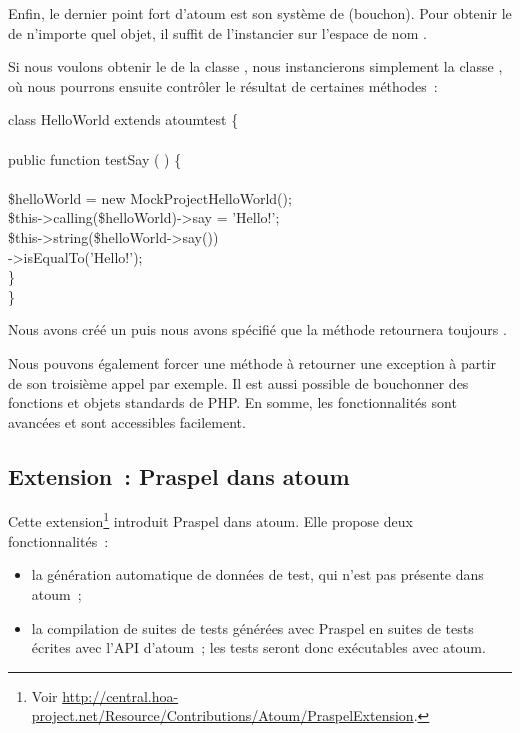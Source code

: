 Enfin, le dernier point fort d'atoum est son système de 
(bouchon). Pour obtenir le  de n'importe quel objet, il suffit
de l'instancier sur l'espace de nom .

\begin{example}

Si nous voulons obtenir le  de la classe
, nous instancierons simplement la classe
, où nous pourrons ensuite
contrôler le résultat de certaines méthodes~:
%
\begin{pre}
class HelloWorld extends \bslash{}atoum\bslash{}test \{ \\
 \\
    public function testSay ( ) \{ \\
 \\
        \$helloWorld = new \bslash{}Mock\bslash{}Project\bslash{}HelloWorld(); \\
        \$this->calling(\$helloWorld)->say = 'Hello!'; \\
        \$this->string(\$helloWorld->say()) \\
                  ->isEqualTo('Hello!'); \\
    \} \\
\}
\end{pre}
%
Nous avons créé un  puis nous avons spécifié que la méthode
 retournera toujours .

\end{example}

Nous pouvons également forcer une méthode à retourner une exception à partir de
son troisième appel par exemple. Il est aussi possible de bouchonner des
fonctions et objets standards de PHP. En somme, les fonctionnalités sont
avancées et sont accessibles facilement.

\subsection{Extension~: Praspel dans atoum}
\label{subsection:tools:extension}

Cette extension\footnote{Voir
\url{http://central.hoa-project.net/Resource/Contributions/Atoum/PraspelExtension}.}
introduit Praspel dans atoum. Elle propose deux fonctionnalités~:
%
\begin{itemize}

\item la génération automatique de données de test, qui n'est pas présente dans
atoum~;

\item la compilation de suites de tests générées avec Praspel en suites de tests
écrites avec l'API d'atoum~; les tests seront donc exécutables avec atoum.

\end{itemize}


